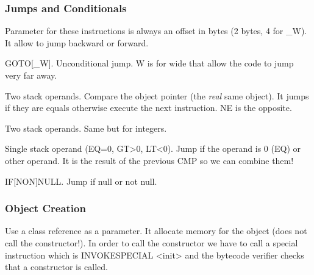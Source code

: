 \subsubsection{Jumps and Conditionals}
Parameter for these instructions is always an offset in bytes (2 bytes, 4 for \_W).
It allow to jump backward or forward.
\theoremstyle{definition}
\begin{definition}[GOTO]
    GOTO[\_W]. Unconditional jump. W is for wide that allow the code to jump
    very far away.
\end{definition}
\theoremstyle{definition}
\begin{definition}[IF\_ACMP(EQ/NQ)]
    Two stack operands. Compare the object pointer (the \textit{real} same
    object). It jumps if they are equals otherwise execute the next instruction.
    NE is the opposite.
\end{definition}
\theoremstyle{definition}
\begin{definition}[IF\_ICMP(EQ/NE/GE/GT/LE/LT)]
    Two stack operands. Same but for integers.
\end{definition}
\theoremstyle{definition}
\begin{definition}[IF(EQ/NE/GE/GT/LE/LT)]
    Single stack operand (EQ=0, GT>0, LT<0). Jump if the operand is 0 (EQ) or
    other operand. It is the result of the previous CMP so we can combine them!
\end{definition}
\theoremstyle{definition}
\begin{definition}[IF]
    IF[NON]NULL. Jump if null or not null.
\end{definition}
\subsubsection{Object Creation}
\theoremstyle{definition}
\begin{definition}[NEW]
    Use a class reference as a parameter. It allocate memory for the object
    (does not call the constructor!). In order to call the constructor we have
    to call a special instruction which is INVOKESPECIAL <init> and the bytecode
    verifier checks that a constructor is called.
\end{definition}
